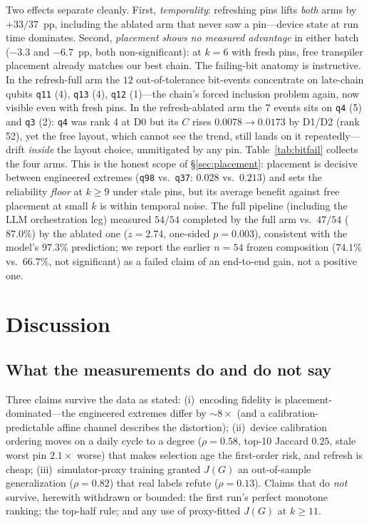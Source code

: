 \documentclass[journal,10pt,twocolumn]{IEEEtran}
\newcommand{\q}[1]{\texttt{q#1}}
\begin{document}
Two effects separate cleanly. First, \emph{temporality}: refreshing pins lifts \emph{both} arms by $+33/37$~pp,
including the ablated arm that never saw a pin---device state at run time dominates. Second, \emph{placement shows no
measured advantage} in either batch ($-3.3$ and $-6.7$~pp, both non-significant): at $k{=}6$ with fresh pins, free
transpiler placement already matches our best chain. The failing-bit anatomy is instructive. In the refresh-full
arm the $12$ out-of-tolerance bit-events concentrate on late-chain qubits \q{11} (4), \q{13} (4), \q{12} (1)---the
chain's forced inclusion problem again, now visible even with fresh pins. In the refresh-ablated arm the $7$ events
sits on \q{4} (5) and \q{3} (2): \q{4} was rank 4 at D0 but its $C$ rises $0.0078\to0.0173$ by D1/D2 (rank 52), yet
the free layout, which cannot see the trend, still lands on it repeatedly---drift \emph{inside} the layout choice,
unmitigated by any pin. Table~\ref{tab:bitfail} collects the four arms. This is the honest scope of \S\ref{sec:placement}: placement is decisive between
engineered extremes (\q{98} vs.\ \q{37}: $0.028$ vs.\ $0.213$) and sets the reliability \emph{floor} at $k\ge9$
under stale pins, but its average benefit against free placement at small $k$ is within temporal noise. The full
pipeline (including the LLM orchestration leg) measured $54/54$ completed by the full arm vs.\ $47/54$
($87.0\%$) by the ablated one ($z{=}2.74$, one-sided $p{=}0.003$), consistent with the model's $97.3\%$ prediction;
we report the earlier $n{=}54$ frozen composition ($74.1\%$ vs.\ $66.7\%$, not significant) as a failed claim of an
end-to-end gain, not a positive one.

\section{Discussion}
\label{sec:discussion}
\subsection{What the measurements do and do not say}
Three claims survive the data as stated: (i)~encoding fidelity is placement-dominated---the engineered extremes
differ by $\sim8\times$ (and a calibration-predictable affine channel describes the distortion); (ii)~device
calibration ordering moves on a daily cycle to a degree ($\rho{=}0.58$, top-10 Jaccard $0.25$, stale worst pin
$2.1\times$ worse) that makes selection age the first-order risk, and refresh is cheap; (iii)~simulator-proxy
training granted $J(G)$ an out-of-sample generalization ($\rho{=}0.82$) that real labels refute
($\rho{=}0.13$). Claims that do \emph{not} survive, herewith withdrawn or bounded: the first run's perfect monotone
ranking; the top-half rule; and any use of proxy-fitted $J(G)$ at $k\ge11$.
\end{document}
